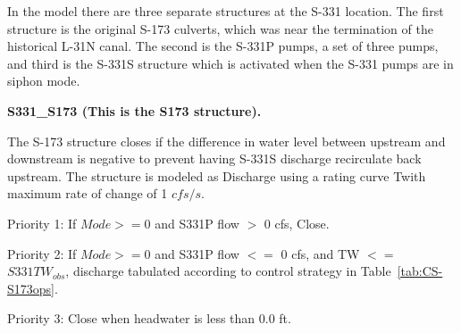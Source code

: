 

In the model there are three separate structures at the S-331 location.
The first structure is the original S-173 culverts, which was near the termination of the historical L-31N canal.
The second is the S-331P pumps, a set of three pumps, and third is the S-331S structure which is activated when the S-331 pumps are in siphon mode.



\textbf{S331\_S173 (This is the S173 structure).}

The S-173 structure closes if the difference in water level between upstream and downstream is negative to prevent having S-331S discharge recirculate back upstream. The structure is modeled as Discharge using a rating curve Twith maximum rate of change of 1 $cfs/s$.



\begin{packed_items}
\item Priority 1: If $Mode>=0$ and  S331P flow $>$ 0 cfs, Close. %
\item Priority 2: If $Mode>=0$ and  S331P flow $<=$ 0 cfs, and TW $<=$ $S331TW_{obs}$, discharge tabulated according to control strategy in Table~\ref{tab:CS-S173ops}.
\item Priority 3: Close when headwater is less than 0.0 ft.
\end{packed_items}

